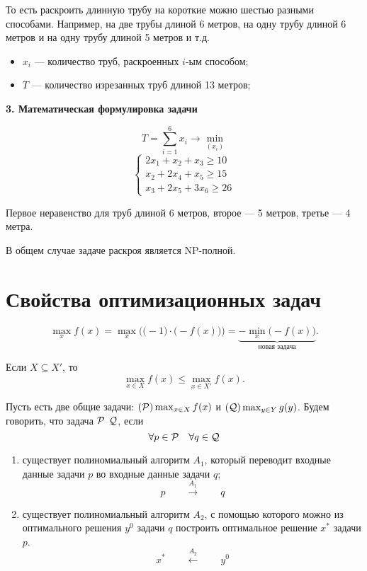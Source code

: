 То есть раскроить длинную трубу на короткие можно шестью разными способами. Например, на две трубы длиной 6 метров, на одну трубу длиной 6 метров и на одну трубу длиной 5 метров и т.д.

\begin{itemize}
	\item $x_i$ --- количество труб, раскроенных $i$-ым способом;
	
	\item $T$ --- количество изрезанных труб длиной 13 метров;
\end{itemize}

\textbf{3. Математическая формулировка задачи}

\[
T = \sum_{i=1}^6 x_i \to \min_{(x_i)}
\]
\[
\begin{cases}
	2x_1 + x_2 + x_3 \ge 10 \\
	x_2 + 2x_4 + x_5 \ge 15 \\
	x_3 + 2x_5 + 3x_6 \ge 26
\end{cases}
\]

Первое неравенство для труб длиной 6 метров, второе --- 5 метров, третье --- 4 метра.

\remark

В общем случае задаче раскроя является NP-полной.

\section{Свойства оптимизационных задач}

\fact

\[
\max_x f(x) = \max_x \Big(\big(-1\big) \cdot \big(-f(x)\big)\Big) = \underbrace{-\min_x \big(-f(x)\big)}_{\text{новая задача}}.
\]


Если $X \subseteq X'$, то
\[
\max_{x \in X} f(x) \le \max_{x \in X'} f(x).
\]


Пусть есть две общие задачи: $(\P) \max_{x \in X} f(x)$ и $(\Q) \max_{y \in Y} g(y)$. Будем говорить, что задача $\P$  $\Q$, если
\[
\forall p \in \P \quad \forall q \in \Q
\]

\begin{enumerate}[nosep]
	\item существует полиномиальный алгоритм $A_1$, который переводит входные данные задачи $p$ во входные данные задачи $q$;
	\[
	p \qquad \stackrel{A_1}{\longrightarrow} \qquad q
	\]
	
	\item существует полиномиальный алгоритм $A_2$, с помощью которого можно из оптимального решения $y^0$ задачи $q$ построить оптимальное решение $x^*$ задачи $p$.
	\[
	x^* \qquad \stackrel{A_2}{\longleftarrow} \qquad y^0
	\]
\end{enumerate}

